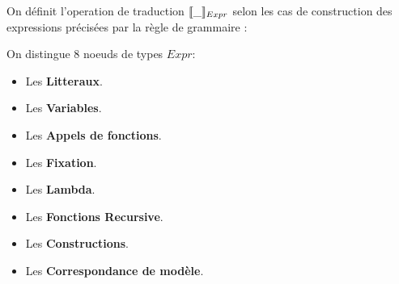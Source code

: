 \documentclass[
  12pt,
]{article}
\providecommand{\tightlist}{%
  \setlength{\itemsep}{0pt}\setlength{\parskip}{0pt}}
\begin{document}
On définit l'operation de traduction \(\llbracket \_ \rrbracket_{Expr}\) selon les cas de construction
des expressions précisées par la règle de grammaire : 

On distingue 8 noeuds de types $Expr$: \begin{itemize}
  \tightlist
  \item
        Les \textbf{Litteraux}.
  \item
        Les \textbf{Variables}.
  \item
        Les \textbf{Appels de fonctions}.
  \item
        Les \textbf{Fixation}.
  \item
        Les \textbf{Lambda}.
  \item
        Les \textbf{Fonctions Recursive}.
  \item
        Les \textbf{Constructions}.
  \item
        Les \textbf{Correspondance de modèle}.
\end{itemize}
\end{document}
